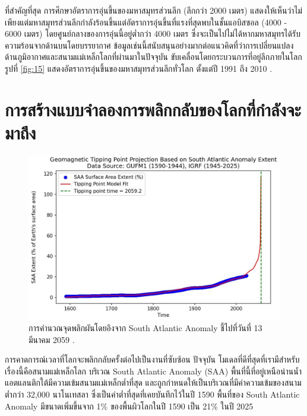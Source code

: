 \documentclass[10pt,twocolumn,letterpaper]{article}
\begin{document}
ที่สำคัญที่สุด การศึกษาอัตราการอุ่นขึ้นของมหาสมุทรส่วนลึก (ลึกกว่า 2000 เมตร) แสดงให้เห็นว่าไม่เพียงแต่มหาสมุทรส่วนลึกกำลังร้อนขึ้นแต่อัตราการอุ่นขึ้นที่แรงที่สุดพบในชั้นแอบิสซอล (4000 - 6000 เมตร) โดยศูนย์กลางของการอุ่นนี้อยู่ต่ำกว่า 4000 เมตร \cite{132,129} ซึ่งจะเป็นไปไม่ได้หากมหาสมุทรได้รับความร้อนจากด้านบนโดยบรรยากาศ ข้อมูลเช่นนี้สนับสนุนอย่างมากต่อแนวคิดที่ว่าการเปลี่ยนแปลงด้านภูมิอากาศและสนามแม่เหล็กโลกที่ผ่านมาในปัจจุบัน ขับเคลื่อนโดยกระบวนการที่อยู่ลึกภายในโลก รูปที่ \ref{fig:15} แสดงอัตราการอุ่นขึ้นของมหาสมุทรส่วนลึกทั่วโลก ตั้งแต่ปี 1991 ถึง 2010 \cite{132}.
\section{การสร้างแบบจำลองการพลิกกลับของโลกที่กำลังจะมาถึง}

\begin{figure}[b]
\begin{center}
   \includegraphics[width=1\linewidth]{saa-crop.jpeg}
\end{center}
   \caption{การคำนวณจุดพลิกผันโดยอิงจาก South Atlantic Anomaly ชี้ไปที่วันที่ 13 มีนาคม 2059 \cite{125,126}.}
\label{fig:16}
\label{fig:onecol}
\end{figure}

การคาดการณ์เวลาที่โลกจะพลิกกลับครั้งต่อไปเป็นงานที่ซับซ้อน ปัจจุบัน โมเดลที่ดีที่สุดที่เรามีสำหรับเรื่องนี้คือสนามแม่เหล็กโลก บริเวณ South Atlantic Anomaly (SAA) พื้นที่นี้ที่อยู่เหนือน่านน้ำแอตแลนติกใต้มีความเข้มสนามแม่เหล็กต่ำที่สุด และถูกกำหนดให้เป็นบริเวณที่มีค่าความเข้มของสนามต่ำกว่า 32,000 นาโนเทสลา \cite{135} ซึ่งเป็นค่าต่ำที่สุดที่เคยบันทึกไว้ในปี 1590 พื้นที่ของ South Atlantic Anomaly มีขนาดเพิ่มขึ้นจาก 1\% ของพื้นผิวโลกในปี 1590 เป็น 21\% ในปี 2025 \cite{136}
\end{document}
